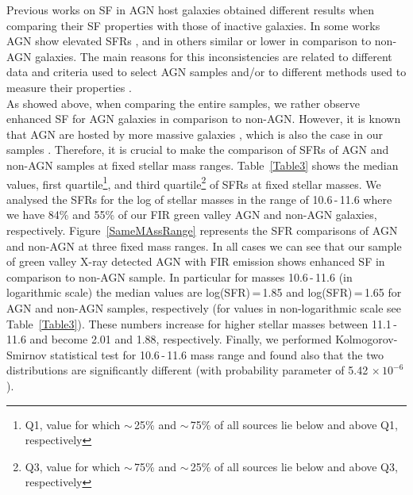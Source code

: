 \documentclass[fleqn,usenatbib]{mnras}
\begin{document}
\indent Previous works on SF in AGN host galaxies obtained different results when comparing their SF properties with those of inactive galaxies. In some works AGN show elevated SFRs \citep[e.g.,][and references therein]{Rosario},  and in others similar \citep[e.g.,][and references therein]{Stanley2015, Xu2015} or lower \citep[e.g.,][and references therein]{Shimizu2015, Leslie2016} in comparison to non-AGN galaxies. The main reasons for this inconsistencies are related to different data and criteria used to select AGN samples \citep{Hickox2009, Ellison2016} and/or to different methods used to measure their properties \citep[e.g.,][]{kauffmann03, Best2012, Ellison2016}.  \\
\indent As showed above, when comparing the entire samples, we rather observe enhanced SF for AGN galaxies in comparison to non-AGN. However, 
it is known that AGN are hosted by more massive galaxies \citep[e.g.,][]{kauffmann03, Leslie2016, Ellison2016}, which is also the case in our samples \citep[see][]{Nkundabakura}. Therefore, it is crucial to make the comparison of SFRs of AGN and non-AGN samples at fixed stellar mass ranges.
Table~\ref{Table3} shows the median values, first quartile\footnote{Q1, value for which $\sim$\,25\% and $\sim$\,75\% of all sources lie below and above Q1, respectively}, and third quartile\footnote{Q3, value for which $\sim$\,75\% and $\sim$\,25\% of all sources lie below and above Q3, respectively} of SFRs at fixed stellar masses. We analysed the SFRs for the log of stellar masses in the range of 10.6\,-\,11.6 where we have 84\% and 55\% of our FIR green valley AGN and non-AGN galaxies, respectively. Figure~\ref{SameMAssRange} represents the SFR comparisons of AGN and non-AGN at three fixed mass ranges. In all cases we can see that our sample of green valley X-ray detected AGN with FIR emission shows enhanced SF in comparison to non-AGN sample. In particular for masses 10.6\,-\,11.6 (in logarithmic scale) the median values are log(SFR)\,=\,1.85 and log(SFR)\,=\,1.65 for AGN and non-AGN samples, respectively (for values in non-logarithmic scale see Table~\ref{Table3}). These numbers increase for higher stellar masses between 11.1\,-\,11.6 and become 2.01 and 1.88, respectively.
Finally, we performed Kolmogorov-Smirnov statistical test for 10.6\,-\,11.6 mass range and found also that the two distributions are significantly different (with probability parameter of 5.42 $\times \,10^{-6}$).
 
\end{document}
